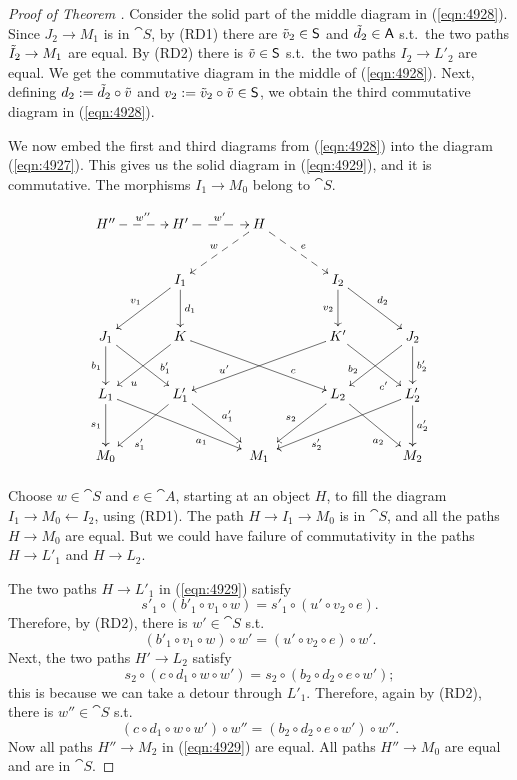 \begin{proof}[Proof of Theorem \tup{\ref{thm:103}}]
Consider the solid part of the middle diagram in (\ref{eqn:4928}).
Since $J_2 \to M_1$ is in $\cat{S}$, by (RD1) there are 
$\tilde{v}_2 \in \operatorname{\mathsf{S}}$ and $\tilde{d}_2 \in \operatorname{\mathsf{A}}$ s.t.\ the two paths
$\tilde{I}_2 \to M_1$ are equal.
By (RD2) there is $\tilde{v} \in \operatorname{\mathsf{S}}$ s.t.\ the two paths 
$I_2 \to L'_2$ are equal. 
We get the commutative diagram in the middle of (\ref{eqn:4928}).
Next, defining 
$d_2 := \tilde{d}_2 \circ \tilde{v}$ and 
$v_2 := \tilde{v}_2 \circ \tilde{v} \in \operatorname{\mathsf{S}}$,
we obtain the third commutative diagram in (\ref{eqn:4928}).

We now embed the first and third diagrams from (\ref{eqn:4928}) into the 
diagram (\ref{eqn:4927}). This gives us the solid diagram in (\ref{eqn:4929}),
and it is commutative. 
The morphisms $I_1 \to M_0$ belong to $\cat{S}$.  

\begin{equation} \label{eqn:4929}
\UseTips  \xymatrix @C=8ex @R=6ex  {
H''
\ar@{-->}[r]^{w''}
& 
H'
\ar@{-->}[r]^{w'}
& 
H
\ar@{-->}[dl]_{w}
\ar@{-->}[dr]^{e}
\\
&
I_1
\ar@{->}[dl]_{v_1}
\ar@{->}[d]^{d_1}
& & 
I_2
\ar@{->}[d]_{v_2}
\ar@{->}[dr]^{d_2}
\\
J_1
\ar[d]_{b_1}
\ar[dr]^(0.7){b'_1}
&
K
\ar[dl]^(0.7){u}
\ar[drr]^(0.7){c}
& & 
K'
\ar[dll]_(0.7){u'}
\ar[dr]_(0.7){c'}
& 
J_2
\ar[dl]_(0.7){b_2}
\ar[d]^{b'_2}
\\
L_1
\ar[d]_{s_1}
\ar[drr]_(0.65){a_1}
&
L'_1
\ar[dl]^(0.65){s'_1}
\ar[dr]^{a'_1}
& & 
L_2
\ar[dl]_{s_2}
\ar[dr]_(0.65){a_2}
& 
L'_2
\ar[dll]^(0.65){s'_2}
\ar[d]^{a'_2}
\\
M_0 
& &
*++{M_1}
& &
M_2
}
\end{equation}

Choose $w \in \cat{S}$ and $e \in \cat{A}$, starting at an object $H$, to fill 
the diagram $I_1 \to M_0 \leftarrow I_2$, using (RD1). The path 
$H \to I_1 \to M_0$ is in $\cat{S}$, and all the paths $H \to M_0$ are equal.   
But we could have failure of commutativity in the paths $H \to L'_1$ and 
$H \to L_2$. 

The two paths  $H \to L'_1$ in (\ref{eqn:4929}) satisfy 
\[ s'_1 \circ (b'_1 \circ v_1 \circ w) = s'_1 \circ (u' \circ v_2 \circ e) . \]
Therefore, by (RD2), there is $w' \in \cat{S}$ s.t.\ 
\[  (b'_1 \circ v_1 \circ w) \circ w' = (u' \circ v_2 \circ e) \circ w' . \]
Next, the two paths  $H' \to L_2$ satisfy 
\[ s_2 \circ (c \circ d_1 \circ w \circ w') = s_2 \circ (b_2 \circ d_2 \circ e 
\circ w') ; \]
this is because we can take a detour through $L'_1$. 
Therefore, again by (RD2), there is $w'' \in \cat{S}$ s.t.\ 
\[ (c \circ d_1 \circ w \circ w') \circ w'' = (b_2 \circ d_2 \circ e \circ w') 
\circ w'' . \]
Now all paths $H'' \to M_2$ in (\ref{eqn:4929}) are equal. All paths 
$H'' \to M_0$ are equal and are in $\cat{S}$. 


\end{proof}
